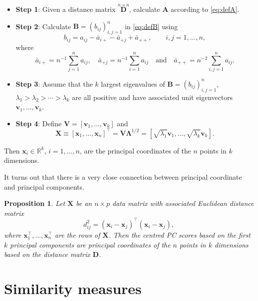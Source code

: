\documentclass[]{book}
\newtheorem{proposition}{Proposition}[chapter]
\theoremstyle{definition}
\theoremstyle{definition}
\theoremstyle{definition}
\theoremstyle{remark}
\begin{document}
\begin{itemize}
\item
  \textbf{Step 1}: Given a distance matrix \(\stackrel{n \times n}{\boldsymbol D}\), calculate \(\boldsymbol A\) according to \eqref{eq:defA}.
\item
  \textbf{Step 2}: Calculate \(\boldsymbol B=(b_{ij})_{i,j=1}^n\) in \eqref{eq:defB} using
  \[
  b_{ij}=a_{ij}-\bar{a}_{i+}-\bar{a}_{+j}+\bar{a}_{++}, \qquad i,j=1, \ldots ,n,
  \]
  where
  \[
  \bar{a}_{i+}=n^{-1}\sum_{j=1}^n a_{ij}, \quad \bar{a}_{+j}=n^{-1}\sum_{i=1}^n a_{ij}\quad
  \text{and} \quad \bar{a}_{++}=n^{-2}\sum_{i,j=1}^n a_{ij}.
  \]
\item
  \textbf{Step 3}: Assume that the \(k\) largest eigenvalues of \(\boldsymbol B=(b_{ij})_{i,j=1}^n\), \(\lambda_1 > \lambda_2 > \cdots > \lambda_k\) are all positive and have associated unit eigenvectors \(\boldsymbol v_1, \ldots , \boldsymbol v_k\).
\item
  \textbf{Step 4}: Define \(\boldsymbol V=[\boldsymbol v_1 , \ldots , \boldsymbol v_k]\) and
  \[
  \boldsymbol X\equiv [\boldsymbol x_1, \ldots , \boldsymbol x_n]^\top = \boldsymbol V\boldsymbol \Lambda^{1/2}=[\sqrt{\lambda_1}\boldsymbol v_1, \ldots, \sqrt{\lambda_k}\boldsymbol v_k].
  \]
\end{itemize}

Then \(\boldsymbol x_i \in \mathbb{R}^k\), \(i=1, \ldots, n\), are the principal coordinates of the \(n\) points in \(k\) dimensions.

It turns out that there is a very close connection between principal coordinate and principal components.

\begin{proposition}
\protect\hypertarget{prp:mds0}{}{\label{prp:mds0} } Let \(\boldsymbol X\) be an \(n \times p\) data matrix with associated Euclidean distance matrix
\[
d_{ij}^2 = (\boldsymbol x_i -\boldsymbol x_j)^\top(\boldsymbol x_i -\boldsymbol x_j),
\]
where \(\boldsymbol x_1^\top, \ldots , \boldsymbol x_n^\top\) are the rows of \(\boldsymbol X\). Then the centred PC scores based on the first \(k\) principal components are principal coordinates of the \(n\) points in \(k\) dimensions based on the distance matrix \(\boldsymbol D\).
\end{proposition}

\hypertarget{similarity-measures}{%
\section{Similarity measures}\label{similarity-measures}}
\end{document}
